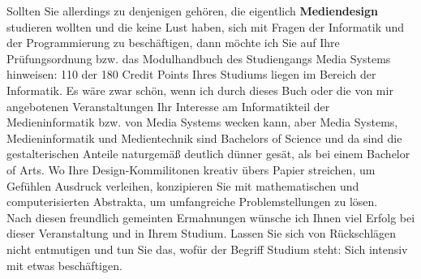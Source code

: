 Sollten Sie allerdings zu denjenigen gehören, die eigentlich \textbf{Mediendesign} studieren wollten und die keine Lust haben, sich mit Fragen der Informatik und der Programmierung zu beschäftigen, dann möchte ich Sie auf Ihre Prüfungsordnung bzw. das Modulhandbuch des Studiengangs Media Systems hinweisen: 110 der 180 Credit Points Ihres Studiums liegen im Bereich der Informatik. Es wäre zwar schön, wenn ich durch dieses Buch oder die von mir angebotenen Veranstaltungen Ihr Interesse am Informatikteil der Medieninformatik bzw. von Media Systems wecken kann, aber Media Systems, Medieninformatik und Medientechnik sind Bachelors of Science und da sind die gestalterischen Anteile naturgemäß deutlich dünner gesät, als bei einem Bachelor of Arts. Wo Ihre Design-Kommilitonen kreativ übers Papier streichen, um Gefühlen Ausdruck verleihen, konzipieren Sie mit mathematischen und computerisierten Abstrakta, um umfangreiche Problemstellungen zu lösen.\\

Nach diesen freundlich gemeinten Ermahnungen wünsche ich Ihnen viel Erfolg bei dieser Veranstaltung und in Ihrem Studium. Lassen Sie sich von Rückschlägen nicht entmutigen und tun Sie das, wofür der Begriff Studium  steht: Sich intensiv mit etwas beschäftigen.
